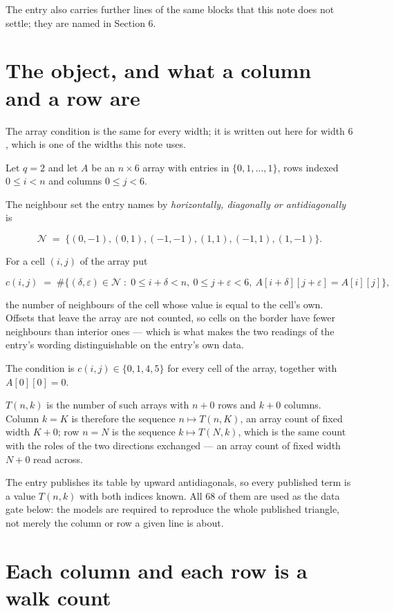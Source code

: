 \documentclass[11pt]{article}
\theoremstyle{definition}
\begin{document}
The entry also carries further lines of the same blocks that this note does not settle; they are named in Section 6.

\section{The object, and what a column and a row are}

The array condition is the same for every width; it is written out here for width $6$, which is one of the widths this note uses.

Let $q = 2$ and let $A$ be an $n \times 6$ array with entries in $\{0,1,\dots,1\}$, rows indexed $0 \le i < n$ and columns $0 \le j < 6$.

The neighbour set the entry names by {\itshape horizontally, diagonally or antidiagonally} is

\[\mathcal{N} \;=\; \{(0,-1), (0,1), (-1,-1), (1,1), (-1,1), (1,-1)\}.\]

For a cell $(i,j)$ of the array put

\[c(i,j) \;=\; \#\bigl\{(\delta,\varepsilon)\in\mathcal{N} \;:\; 0\le i+\delta<n,\ 0\le j+\varepsilon<6,\ A[i+\delta][j+\varepsilon] = A[i][j]\bigr\},\]

the number of neighbours of the cell whose value is equal to the cell's own. Offsets that leave the array are not counted, so cells on the border have fewer neighbours than interior ones --- which is what makes the two readings of the entry's wording distinguishable on the entry's own data.

The condition is $c(i,j) \in \{0, 1, 4, 5\}$ for every cell of the array, together with $A[0][0]=0$.

$T(n,k)$ is the number of such arrays with $n + 0$ rows and $k + 0$ columns. Column $k = K$ is therefore the sequence $n \mapsto T(n,K)$, an array count of fixed width $K + 0$; row $n = N$ is the sequence $k \mapsto T(N,k)$, which is the same count with the roles of the two directions exchanged --- an array count of fixed width $N + 0$ read across.

The entry publishes its table by upward antidiagonals, so every published term is a value $T(n,k)$ with both indices known. All 68 of them are used as the data gate below: the models are required to reproduce the whole published triangle, not merely the column or row a given line is about.

\section{Each column and each row is a walk count}
\end{document}
